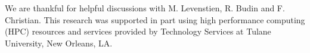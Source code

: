\documentclass[aps,pra,twocolumn,showpacs,superscriptaddress,floatfix,10pt]{revtex4}
\begin{document}
\acknowledgments
We are thankful for helpful discussions with M. Levenstien, R. Budin and F. Christian. This research was supported in part using high performance computing (HPC) resources and services provided by Technology Services at Tulane University, New Orleans, LA.
\end{document}
